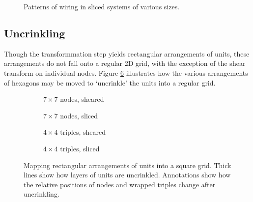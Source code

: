 			\begin{figure}
				\center
				\caption{Patterns of wiring in sliced systems of various sizes.}
				\label{fig:slicing-examples}
			\end{figure}
			
		\subsection{Uncrinkling}
			
			Though the transformmation step yields rectangular arrangements of units,
			these arrangements do not fall onto a regular 2D grid, with the exception
			of the shear transform on individual nodes. Figure \ref{fig:uncrinkling}
			illustrates how the various arrangements of hexagons may be moved to
			`uncrinkle' the units into a regular grid.
			
			\begin{figure}
				\center
				\begin{subfigure}[b]{0.44\linewidth}
					\center
					
					\caption{$7 \times 7$ nodes, sheared}
					\label{fig:uncrinkling-node-sheared}
				\end{subfigure}
				\begin{subfigure}[b]{0.44\linewidth}
					\center
					
					\caption{$7 \times 7$ nodes, sliced}
					\label{fig:uncrinkling-node-sliced}
				\end{subfigure}
				
				\vspace{1cm}
				
				\begin{subfigure}[b]{0.44\linewidth}
					\center
					
					\caption{$4 \times 4$ triples, sheared}
					\label{fig:uncrinkling-sheared}
				\end{subfigure}
				\begin{subfigure}[b]{0.44\linewidth}
					\center
					
					\caption{$4 \times 4$ triples, sliced}
					\label{fig:uncrinkling-sliced}
				\end{subfigure}
				
				\vspace{1em}
				
				\caption{Mapping rectangular arrangements of units into a square grid.
				Thick lines show how layers of units are uncrinkled.  Annotations show
				how the relative positions of nodes and wrapped triples change after
				uncrinkling.}
				\label{fig:uncrinkling}
			\end{figure}
			
